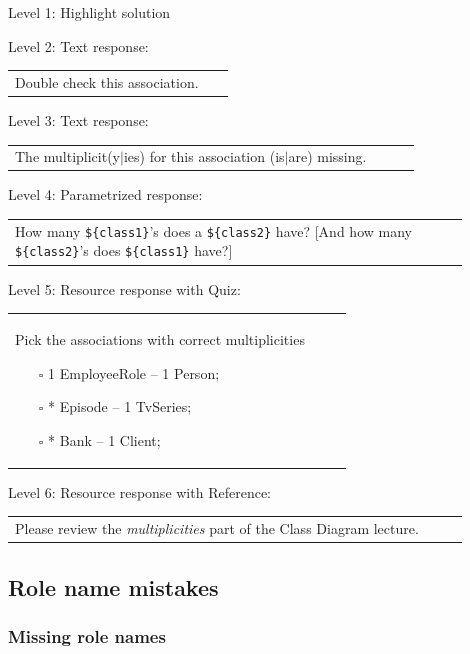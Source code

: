 \noindent Level 1: Highlight solution  \medskip

\noindent Level 2: Text response: \medskip

\begin{tabular}{|p{0.9\linewidth}}
Double check this association.
\end{tabular} \medskip

\noindent Level 3: Text response: \medskip

\begin{tabular}{|p{0.9\linewidth}}
The multiplicit(y$|$ies) for this association (is$|$are) missing.
\end{tabular} \medskip

\noindent Level 4: Parametrized response: \medskip

\begin{tabular}{|p{0.9\linewidth}}
How many \verb|${class1}|'s does a \verb|${class2}| have? [And how many \verb|${class2}|'s does \verb|${class1}| have?]
\end{tabular} \medskip

\noindent Level 5: Resource response with Quiz: \medskip

\begin{tabular}{|p{0.9\linewidth}}
Pick the associations with correct multiplicities

\begin{itemize}
    \item[$\square$] 1 EmployeeRole -- 1 Person;
    \item[$\square$] * Episode -- 1 TvSeries;
    \item[$\square$] * Bank -- 1 Client;
\end{itemize}

\end{tabular} \medskip

\noindent Level 6: Resource response with Reference: \medskip

\begin{tabular}{|p{0.9\linewidth}}
Please review the \textit{multiplicities} part of the Class Diagram lecture.
\end{tabular} \medskip


\subsection{Role name mistakes}

\subsubsection{Missing role names}

